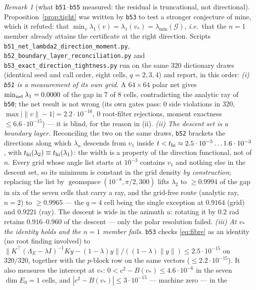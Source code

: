 \documentclass[11pt]{article}
\theoremstyle{remark}
\newtheorem{remark}{Remark}[section]
\newcommand{\Gr}{\mathcal{G}}
\newcommand{\Le}{\Lambda_E}
\begin{document}
\begin{remark}[what \texttt{b51}--\texttt{b55} measured: the residual is truncational, not directional]
\label{rem:tight}
Proposition~\ref{prop:tight} was written by \texttt{b53} to test a stronger conjecture of mine, which
it refuted: that $\min_v\lambda_1(v)=\lambda_1(v_\ast)=\lambda_{\min}(\Gr)$, \emph{i.e.}\ that the
$n=1$ member already attains the certificate at the right direction. Scripts
\texttt{b51\_net\_lambda2\_direction\_\allowbreak moment.py}, \texttt{b52\_boundary\_layer\_reconciliation.py}
and \texttt{b53\_exact\_direction\_tightness.py} run on the same $320$ dictionary draws (identical seed
and call order, eight cells, $q=2,3,4$) and report, in this order:
\emph{(i) \texttt{b51} is a measurement of its own grid.} A $64\times64$ polar net gives
$\min_{\rm net}\lambda_1=0.0000$ of the gap in $7$ of $8$ cells, contradicting the analytic ray of
\texttt{b50}; the net result is not wrong (its own gates pass: $0$ side violations in $320$,
$\max|\|v\|-1|=2.2\cdot10^{-16}$, $0$ root-filter rejections, moment exactness
$\le6.6\cdot10^{-15}$) --- it is blind, for the reason in (ii).
\emph{(ii) The descent set is a boundary layer.} Reconciling the two on the same draws,
\texttt{b52} brackets the directions along which $\lambda_n$ descends from $v_1$ inside
$t<t_{\rm hi}\approx2.5\cdot10^{-5}\ldots1.6\cdot10^{-3}$, with $t_{\rm hi}(\lambda_2)\equiv
t_{\rm hi}(\lambda_1)$: the width is a property of the direction functional, not of $n$. Every grid
whose angle list starts at $10^{-3}$ contains $v_1$ and nothing else in the descent set, so its
minimum is constant in the grid density \emph{by construction}; replacing the list by
$\operatorname{geomspace}(10^{-8},\pi/2,300)$ lifts $\lambda_2$ to $\ge0.9994$ of the gap in six of the
seven cells that carry a ray, and the grid-free route (analytic ray, $n=2$) to $\ge0.9965$ --- the
$q=4$ cell being the single exception at $0.9164$ (grid) and $0.9221$ (ray). The descent is wide in the azimuth
$u$: rotating it by $0.2$ rad retains $0.916$--$0.960$ of the descent --- only the polar resolution failed.
\emph{(iii) At $v_\ast$ the identity holds and the $n=1$ member fails.} \texttt{b53} checks
\eqref{eq:fibre} as an identity (no root finding involved) to
$\|K^{\top}(\Le-\lambda I)^{-1}Ky-(1-\lambda)y\|/((1-\lambda)\|y\|)\le2.5\cdot10^{-15}$ on $320/320$,
together with the $p$-block row on the same vectors ($\le2.2\cdot10^{-15}$). It also measures the
intercept at $v_\ast$: $0<c^{2}-B(v_\ast)\le4.6\cdot10^{-6}$ in the seven $\operatorname{dim}E_0=1$
cells, and $|c^{2}-B(v_\ast)|\le3\cdot10^{-15}$ --- machine zero --- in the

\end{remark}
\end{document}
